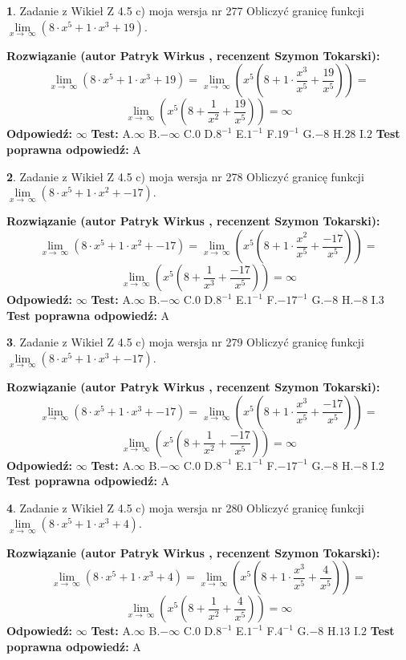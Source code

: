 \documentclass[12pt, a4paper]{article}
\theoremstyle{definition} %
\newtheorem{zad}{}
\newcommand{\zadStart}[1]{\begin{zad}#1\newline}
\newcommand{\zadStop}{\end{zad}}
\newcommand{\rozwStart}[2]{\noindent \textbf{Rozwiązanie (autor #1 , recenzent #2): }\newline}
\newcommand{\rozwStop}{\newline}
\newcommand{\odpStart}{\noindent \textbf{Odpowiedź:}\newline}
\newcommand{\odpStop}{\newline}
\newcommand{\testStart}{\noindent \textbf{Test:}\newline}
\newcommand{\testStop}{\newline}
\newcommand{\kluczStart}{\noindent \textbf{Test poprawna odpowiedź:}\newline}
\newcommand{\kluczStop}{\newline}
\begin{document}
\zadStart{Zadanie z Wikieł Z 4.5 c) moja wersja nr 277}
Obliczyć granicę funkcji  $\lim\limits_{x\to\ \infty}(8 \cdot x^{5}+1 \cdot x^{3}+19)$.
\zadStop
\rozwStart{Patryk Wirkus}{Szymon Tokarski}
$$\lim\limits_{x\to\ \infty}(8 \cdot x^{5}+1 \cdot x^{3}+19) = \lim\limits_{x\to\ \infty}(x^{5}(8 +1 \cdot \frac{x^{3}}{x^{5}}+\frac{19}{x^{5}})) =$$ $$\lim\limits_{x\to\ \infty}(x^{5}(8 +\frac{1}{x^{2}}+\frac{19}{x^{5}})) =\infty$$
\rozwStop
\odpStart
$\infty$
\odpStop
\testStart
A.$\infty$ B.$-\infty$ C.$0$ D.$8^{-1}$ E.$1^{-1}$
F.$19^{-1}$ G.$-8$
H.$28$
I.$2$
\testStop
\kluczStart
A
\kluczStop



\zadStart{Zadanie z Wikieł Z 4.5 c) moja wersja nr 278}
Obliczyć granicę funkcji  $\lim\limits_{x\to\ \infty}(8 \cdot x^{5}+1 \cdot x^{2}+-17)$.
\zadStop
\rozwStart{Patryk Wirkus}{Szymon Tokarski}
$$\lim\limits_{x\to\ \infty}(8 \cdot x^{5}+1 \cdot x^{2}+-17) = \lim\limits_{x\to\ \infty}(x^{5}(8 +1 \cdot \frac{x^{2}}{x^{5}}+\frac{-17}{x^{5}})) =$$ $$\lim\limits_{x\to\ \infty}(x^{5}(8 +\frac{1}{x^{3}}+\frac{-17}{x^{5}})) =\infty$$
\rozwStop
\odpStart
$\infty$
\odpStop
\testStart
A.$\infty$ B.$-\infty$ C.$0$ D.$8^{-1}$ E.$1^{-1}$
F.$-17^{-1}$ G.$-8$
H.$-8$
I.$3$
\testStop
\kluczStart
A
\kluczStop



\zadStart{Zadanie z Wikieł Z 4.5 c) moja wersja nr 279}
Obliczyć granicę funkcji  $\lim\limits_{x\to\ \infty}(8 \cdot x^{5}+1 \cdot x^{3}+-17)$.
\zadStop
\rozwStart{Patryk Wirkus}{Szymon Tokarski}
$$\lim\limits_{x\to\ \infty}(8 \cdot x^{5}+1 \cdot x^{3}+-17) = \lim\limits_{x\to\ \infty}(x^{5}(8 +1 \cdot \frac{x^{3}}{x^{5}}+\frac{-17}{x^{5}})) =$$ $$\lim\limits_{x\to\ \infty}(x^{5}(8 +\frac{1}{x^{2}}+\frac{-17}{x^{5}})) =\infty$$
\rozwStop
\odpStart
$\infty$
\odpStop
\testStart
A.$\infty$ B.$-\infty$ C.$0$ D.$8^{-1}$ E.$1^{-1}$
F.$-17^{-1}$ G.$-8$
H.$-8$
I.$2$
\testStop
\kluczStart
A
\kluczStop



\zadStart{Zadanie z Wikieł Z 4.5 c) moja wersja nr 280}
Obliczyć granicę funkcji  $\lim\limits_{x\to\ \infty}(8 \cdot x^{5}+1 \cdot x^{3}+4)$.
\zadStop
\rozwStart{Patryk Wirkus}{Szymon Tokarski}
$$\lim\limits_{x\to\ \infty}(8 \cdot x^{5}+1 \cdot x^{3}+4) = \lim\limits_{x\to\ \infty}(x^{5}(8 +1 \cdot \frac{x^{3}}{x^{5}}+\frac{4}{x^{5}})) =$$ $$\lim\limits_{x\to\ \infty}(x^{5}(8 +\frac{1}{x^{2}}+\frac{4}{x^{5}})) =\infty$$
\rozwStop
\odpStart
$\infty$
\odpStop
\testStart
A.$\infty$ B.$-\infty$ C.$0$ D.$8^{-1}$ E.$1^{-1}$
F.$4^{-1}$ G.$-8$
H.$13$
I.$2$
\testStop
\kluczStart
A
\kluczStop
\end{document}
